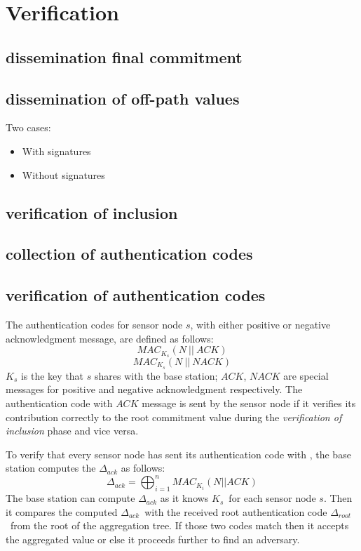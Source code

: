 \chapter{Verification}


\section{dissemination final commitment}
\section{dissemination of off-path values}
	Two cases:
	\begin{itemize}
		\item {With signatures}
		\item {Without signatures}
	\end{itemize}
\section{verification of inclusion}
\section{collection of authentication codes}
\section{verification of authentication codes}
	\label{sec:verficiation-of-authentication-codes}
	The authentication codes for sensor node $s$, with either positive or negative acknowledgment message, are defined as follows:
	\begin{equation}
		MAC_{K_{s}}(N\ ||\ \textit{ACK})
	\end{equation}
	\begin{equation}
		MAC_{K_{s}}(N\ ||\ \textit{NACK})
	\end{equation}
	$K_{s}$ is the key that $s$ shares with the base station;
	$\textit{ACK}$, $\textit{NACK}$ are special messages for positive and negative acknowledgment respectively.
	The authentication code with $\textit{ACK}$ message is sent by the sensor node if it verifies its contribution correctly to the root commitment value during the 
	\textit{verification of inclusion} phase and vice versa.
	
	To verify that every sensor node has sent its authentication code with \ack, the base station computes the $\Delta_{ack}$ as follows:
	\begin{equation}
		\displaystyle{\Delta_{ack} = \bigoplus_{i = 1}^n MAC_{K_{i}}(N || ACK) }
	\end{equation}
	The base station can compute $\Delta_{ack}$ as it knows $K_{s}$\ for each sensor node $s$.
	Then it compares the computed $\Delta_{ack}$\ with the received root authentication code $\Delta_{root}$\ from the root of the aggregation tree. 
	If those two codes match then it accepts the aggregated value or else it proceeds further to find an adversary. 

